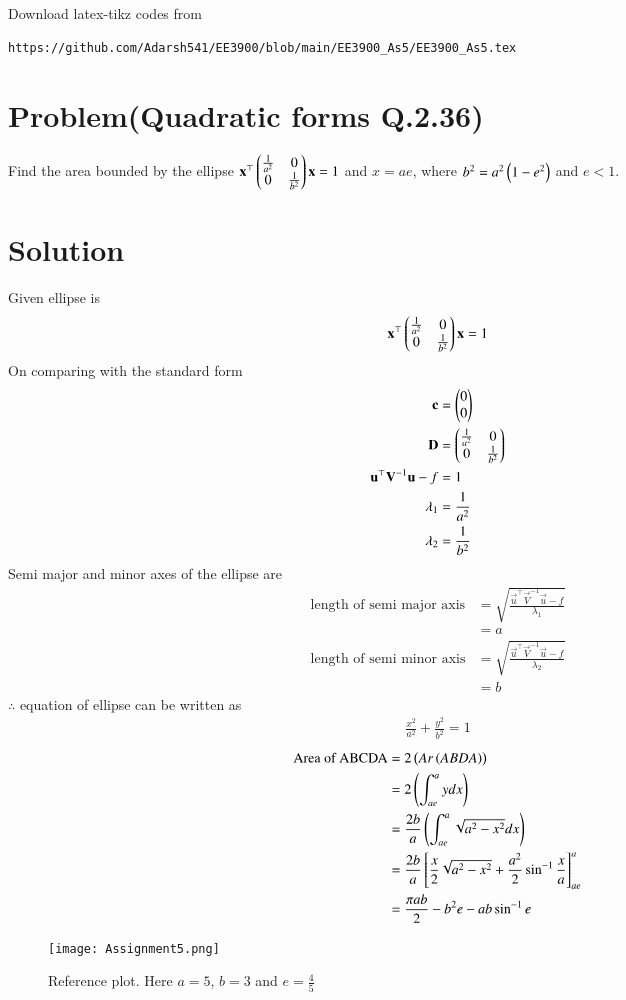 \documentclass[journal,12pt,twocolumn]{IEEEtran}
\begin{document}
%
Download latex-tikz codes from 
%
\begin{lstlisting}
https://github.com/Adarsh541/EE3900/blob/main/EE3900_As5/EE3900_As5.tex
\end{lstlisting}
\section{Problem(Quadratic forms Q.2.36)}
Find the area bounded by the ellipse $\Vec{x}^{\top}\myvec{\frac{1}{a^2} & 0\\ 0 &\frac{1}{b^2}}\vec{x}=1$ and $x=ae$, where $b^2=a^2\left(1-e^2\right)$ and $e<1$.
\section{Solution}
Given ellipse is 
\begin{align}
    \Vec{x}^{\top}\myvec{\frac{1}{a^2} & 0\\ 0 &\frac{1}{b^2}}\vec{x}=1
\end{align}
On comparing with the standard form
\begin{align}
    \mathbf{c}&=\begin{pmatrix}0\\0\end{pmatrix}\\
    \mathbf{D}&=\begin{pmatrix}\frac{1}{a^2} & 0\\ 0 &\frac{1}{b^2}\end{pmatrix}\\
    \mathbf{u}^{\top}\mathbf{V}^{-1}\mathbf{u}-f&=1\\
    \lambda_1&=\frac{1}{a^2}\\
    \lambda_2&=\frac{1}{b^2}
\end{align}
Semi major and minor axes of the ellipse are
\begin{align}
    \text{length of semi major axis}&=\sqrt{\frac{\vec{u}^{\top}\vec{V}^{-1}\vec{u}-f}{\lambda_1}}\\
    &=a\\
    \text{length of semi minor axis}&=\sqrt{\frac{\vec{u}^{\top}\vec{V}^{-1}\vec{u}-f}{\lambda_2}}\\
    &=b
\end{align}
$\therefore$ equation of ellipse can be written as
\begin{align}
    \frac{x^2}{a^2}+\frac{y^2}{b^2}=1
\end{align}
\begin{align}
    \text{Area of ABCDA}&=2\left(Ar\left(ABDA\right)\right)\\
    &=2\left(\int_{ae}^{a}ydx\right)\\
    &=\frac{2b}{a}\left(\int_{ae}^{a}\sqrt{a^2-x^2}dx\right)\\
    &=\frac{2b}{a}{}\left[\frac{x}{2}\sqrt{a^2-x^2}+\frac{a^2}{2}\sin^{-1}{\frac{x}{a}}\right]_{ae}^{a}\\
    &=\frac{\pi ab}{2}-b^2e-ab\sin^{-1}{e}
\end{align}
\begin{figure}[!h]
 \centering
 \texttt{[image: Assignment5.png]}
 \caption{Reference plot. Here $a=5$, $b=3$ and $e=\frac{4}{5}$}
 \label{plot}
\end{figure}
\end{document}
